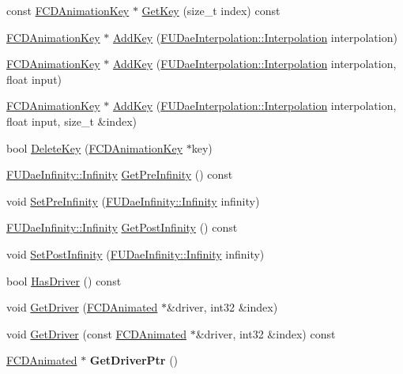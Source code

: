 \begin{DoxyCompactItemize}
\item 
const \hyperlink{classFCDAnimationKey}{FCDAnimationKey} $\ast$ \hyperlink{classFCDAnimationCurve_a26c830e127b6a87308bcd7b3fcef3dd7}{GetKey} (size\_\-t index) const 
\item 
\hyperlink{classFCDAnimationKey}{FCDAnimationKey} $\ast$ \hyperlink{classFCDAnimationCurve_a58e0870ef3f44d5711694103371df555}{AddKey} (\hyperlink{namespaceFUDaeInterpolation_a209a941c2fb6ece1325352968aa0374f}{FUDaeInterpolation::Interpolation} interpolation)
\item 
\hyperlink{classFCDAnimationKey}{FCDAnimationKey} $\ast$ \hyperlink{classFCDAnimationCurve_ace18196c3824cf30dab1fffe2a7590e8}{AddKey} (\hyperlink{namespaceFUDaeInterpolation_a209a941c2fb6ece1325352968aa0374f}{FUDaeInterpolation::Interpolation} interpolation, float input)
\item 
\hyperlink{classFCDAnimationKey}{FCDAnimationKey} $\ast$ \hyperlink{classFCDAnimationCurve_a506f618558dcbf95cbae57e1f98ffd6b}{AddKey} (\hyperlink{namespaceFUDaeInterpolation_a209a941c2fb6ece1325352968aa0374f}{FUDaeInterpolation::Interpolation} interpolation, float input, size\_\-t \&index)
\item 
bool \hyperlink{classFCDAnimationCurve_a056f03ba3077bb7238ae12530d670358}{DeleteKey} (\hyperlink{classFCDAnimationKey}{FCDAnimationKey} $\ast$key)
\item 
\hyperlink{namespaceFUDaeInfinity_a9d8fb86affe94d1586d728d4c2e89008}{FUDaeInfinity::Infinity} \hyperlink{classFCDAnimationCurve_ae782d284b00751674f233af37d1be31d}{GetPreInfinity} () const 
\item 
void \hyperlink{classFCDAnimationCurve_a854c8a287e5a06adb76b185a3b158d70}{SetPreInfinity} (\hyperlink{namespaceFUDaeInfinity_a9d8fb86affe94d1586d728d4c2e89008}{FUDaeInfinity::Infinity} infinity)
\item 
\hyperlink{namespaceFUDaeInfinity_a9d8fb86affe94d1586d728d4c2e89008}{FUDaeInfinity::Infinity} \hyperlink{classFCDAnimationCurve_a99c4ee14480666c4f203b616a3bfb026}{GetPostInfinity} () const 
\item 
void \hyperlink{classFCDAnimationCurve_a3ad6a612d70548dc221c66852f3119ac}{SetPostInfinity} (\hyperlink{namespaceFUDaeInfinity_a9d8fb86affe94d1586d728d4c2e89008}{FUDaeInfinity::Infinity} infinity)
\item 
bool \hyperlink{classFCDAnimationCurve_a458414600d521c80d5a1b96d10ec22ae}{HasDriver} () const 
\item 
void \hyperlink{classFCDAnimationCurve_ae97116da1f894405a10ff9b7c6b8d78d}{GetDriver} (\hyperlink{classFCDAnimated}{FCDAnimated} $\ast$\&driver, int32 \&index)
\item 
void \hyperlink{classFCDAnimationCurve_a8a489fc84d0a1a1314a70b599cf46e4b}{GetDriver} (const \hyperlink{classFCDAnimated}{FCDAnimated} $\ast$\&driver, int32 \&index) const 
\item 
\hypertarget{classFCDAnimationCurve_afdacf9cf08a2370af43b2eabe9b97cd2}{
\hyperlink{classFCDAnimated}{FCDAnimated} $\ast$ {\bfseries GetDriverPtr} ()}
\label{classFCDAnimationCurve_afdacf9cf08a2370af43b2eabe9b97cd2}


\end{DoxyCompactItemize}
